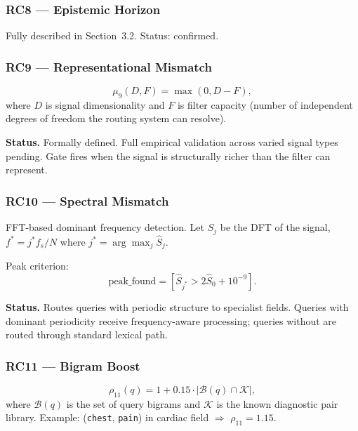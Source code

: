 \documentclass[11pt,twoside]{article}
\begin{document}
\subsubsection{RC8 --- Epistemic Horizon}

Fully described in Section~3.2. Status: confirmed.

\subsubsection{RC9 --- Representational Mismatch}

\[
  \mu_9(D, F) = \max(0, D - F),
\]
where $D$ is signal dimensionality and $F$ is filter capacity (number of
independent degrees of freedom the routing system can resolve).

\begin{pendingenv}
\textbf{Status.} Formally defined. Full empirical validation across varied
signal types pending. Gate fires when the signal is structurally richer than the
filter can represent.
\end{pendingenv}

\subsubsection{RC10 --- Spectral Mismatch}

FFT-based dominant frequency detection. Let $\hat{S}_j$ be the DFT of the signal,
$f^* = j^* f_s / N$ where $j^* = \arg\max_j \hat{S}_j$.

Peak criterion:
\[
  \text{peak\_found} = [\hat{S}_{j^*} > 2\hat{S}_0 + 10^{-9}].
\]

\begin{confirmedenv}
\textbf{Status.} Routes queries with periodic structure to specialist fields.
Queries with dominant periodicity receive frequency-aware processing;
queries without are routed through standard lexical path.
\end{confirmedenv}

\subsubsection{RC11 --- Bigram Boost}

\[
  \rho_{11}(q) = 1 + 0.15 \cdot |\mathcal{B}(q) \cap \mathcal{K}|,
\]
where $\mathcal{B}(q)$ is the set of query bigrams and $\mathcal{K}$ is the known
diagnostic pair library. Example: (\texttt{chest}, \texttt{pain}) in cardiac field
$\Rightarrow$ $\rho_{11} = 1.15$.
\end{document}
